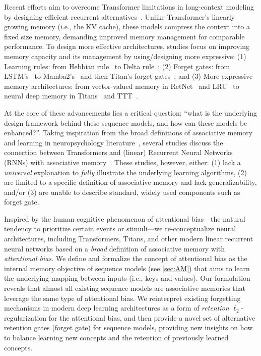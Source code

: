 \documentclass{article}
\newcommand{\citep}{\parencite}
\theoremstyle{plain}
\theoremstyle{definition}
\theoremstyle{remark}
\newcommand{\head}[1]{\vspace{1.7mm}\noindent{{\textcolor{c2}{\bf #1.}}}}
\begin{document}
Recent efforts aim to overcome Transformer limitations in long-context modeling by designing efficient recurrent alternatives~\citep{neil2017delta, smith2022simplified, behrouz2024titans}. Unlike Transformer's linearly growing memory (i.e., the KV cache), these models compress the context into a fixed size memory, demanding improved memory management for comparable performance. To design more effective architectures, studies focus on improving memory capacity and its management by using/designing more expressive: (1) Learning rules: from Hebbian rule~\citep{hebb2005organization} to Delta rule~\citep{neil2017delta}; (2) Forget gates: from LSTM's~\citep{LSTM} to Mamba2's~\citep{dao2024transformers} and then Titan's forget gates~\citep{behrouz2024titans}; and (3) More expressive memory architectures: from vector-valued memory in RetNet~\citep{sun2023retentive} and LRU~\citep{orvieto2023resurrecting} to neural deep memory in Titans~\citep{behrouz2024titans} and TTT~\citep{sun2024learning}.

At the core of these advancements lies a critical question: ``what is the underlying design framework behind these sequence models, and how can these models be enhanced?''. Taking inspiration from the broad definitions of associative memory and learning in neuropsychology literature~\citep{okano2000learning}, several studies discuss the connection between Transformers and (linear) Recurrent Neural Networks (RNNs) with associative memory~\citep{hopfield1982neural, ramsauer2021hopfield, bietti2023birth}. These studies, however, either: (1) lack a \emph{universal} explanation to \emph{fully} illustrate the underlying learning algorithms, (2) are limited to a specific definition of associative memory and lack generalizability, and/or (3) are unable to describe standard, widely used components such as forget gate.   

\head{Contributions}
Inspired by the human cognitive phenomenon of attentional bias—the natural tendency to prioritize certain events or stimuli—we re-conceptualize neural architectures, including Transformers, Titans, and other modern linear recurrent neural networks based on a \emph{broad} definition of associative memory with \emph{attentional bias}. We define and formalize the concept of {attentional bias} as the internal memory objective of sequence models (see \autoref{sec:AM}) that aims to learn the underlying mapping between inputs (i.e., keys and values). Our formulation reveals that almost all existing sequence models are associative memories that leverage the same type of attentional bias. We reinterpret existing forgetting mechanisms in modern deep learning architectures as a form of \emph{retention} $\ell_2$-regularization for the attentional bias, and then provide a novel set of alternative retention gates (forget gate) for sequence models, providing new insights on how to balance learning new concepts and the retention of previously learned concepts.
\end{document}
